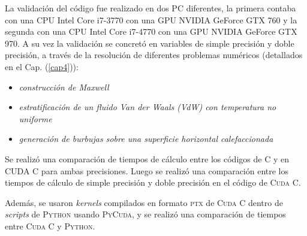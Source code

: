 La validación del código fue realizado en dos PC diferentes, la primera contaba con una CPU Intel Core i7-3770 con una GPU NVIDIA GeForce GTX 760 y la segunda con una CPU Intel Core i7-4770 con una GPU NVIDIA GeForce GTX 970. A su vez la validación se concretó en variables de simple precisión y doble precisión, a través de la resolución de diferentes problemas numéricos (detallados en el Cap. (\ref{cap4})):

\begin{itemize}
	\item \textit{construcción de Maxwell}
	\item \textit{estratificación de un fluido Van der Waals (VdW) con temperatura no uniforme}
	\item \textit{generación de burbujas sobre una superficie horizontal calefaccionada}
\end{itemize} 

Se realizó una comparación de tiempos de cálculo entre los códigos de \textsc{C} y en \textsc{CUDA C} para ambas precisiones. Luego se realizó una comparación entre los tiempos de cálculo de simple precisión y doble precisión en el código de \textsc{Cuda C}.

Además, se usaron \textit{kernels} compilados en formato \textsc{ptx} de \textsc{Cuda C} dentro de \textit{scripts} de \textsc{Python} usando \textsc{PyCuda}, y se realizó una comparación de tiempos entre \textsc{Cuda C} y \textsc{Python}.


